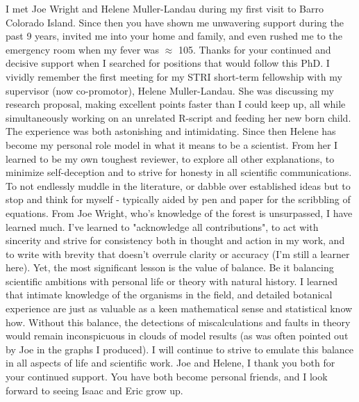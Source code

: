 \documentclass[b5paper,justified]{tufte-book} %
\begin{document}
\begin{fullwidth}
I met Joe Wright and Helene Muller-Landau during my first visit to Barro Colorado Island. Since then you have shown me unwavering support during the past 9 years, invited me into your home and family, and even rushed me to the emergency room when my fever was $\approx$ 105.  Thanks for your continued and decisive support when I searched for positions that would follow this PhD. I vividly remember the first meeting for my STRI short-term fellowship with my supervisor (now co-promotor), Helene Muller-Landau. She was discussing my research proposal, making excellent points faster than I could keep up, all while simultaneously working on an unrelated R-script and feeding her new born child. The experience was both astonishing and intimidating. Since then Helene has become my personal role model in what it means to be a scientist.  From her I learned to be my own toughest reviewer, to explore all other explanations, to minimize self-deception and to strive for honesty in all scientific communications. To not endlessly muddle in the literature, or dabble over established ideas but to stop and think for myself - typically aided by pen and paper for the scribbling of equations. From Joe Wright, who's knowledge of the forest is unsurpassed, I have learned much. I've learned to "acknowledge all contributions", to act with sincerity and strive for consistency both in thought and action in my work, and to write with brevity that doesn't overrule clarity or accuracy (I'm still a learner here). Yet, the most significant lesson is the value of balance. Be it balancing scientific ambitions with personal life or theory with natural history.  I learned that intimate knowledge of the organisms in the field, and detailed botanical experience are just as valuable as a keen mathematical sense and statistical know how. Without this balance, the detections of miscalculations and faults in theory would remain inconspicuous in clouds of model results (as was often pointed out by Joe in the graphs I produced). I will continue to strive to emulate this balance in all aspects of life and scientific work.  Joe and Helene, I thank you both for your continued support. You have both become personal friends, and I look forward to seeing Isaac and Eric grow up. \end{fullwidth}
\end{document}
